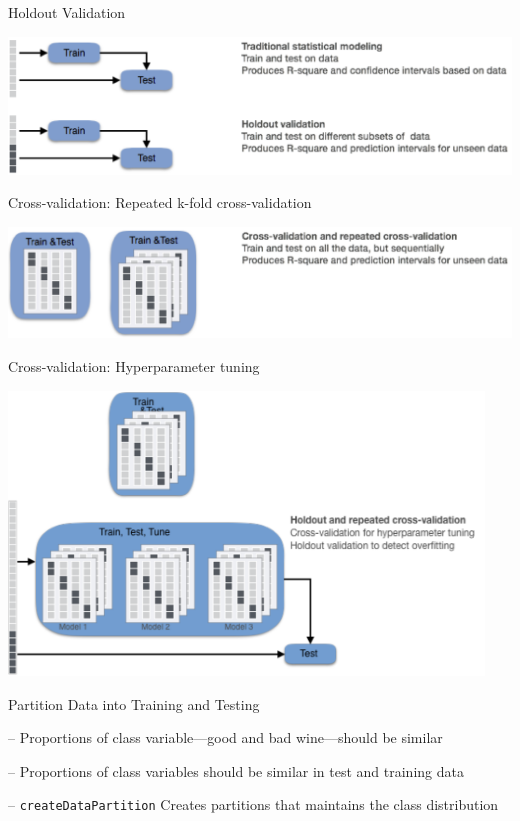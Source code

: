 \documentclass[ignorenonframetext,]{beamer}
\begin{document}
\begin{frame}{Holdout Validation}

\includegraphics[width=10.87in]{1.FittingValidation}

\end{frame}

\begin{frame}{Cross-validation: Repeated k-fold cross-validation}

\includegraphics[width=10.88in]{2. CrossvalidationRepeatedcrossvalidation}

\end{frame}

\begin{frame}{Cross-validation: Hyperparameter tuning}

\includegraphics[width=4.97in]{3.TrainTestTune}

\end{frame}

\begin{frame}[fragile]{Partition Data into Training and Testing}

-- Proportions of class variable---good and bad wine---should be similar

-- Proportions of class variables should be similar in test and training
data

-- \texttt{createDataPartition} Creates partitions that maintains the
class distribution

\end{frame}
\end{document}
